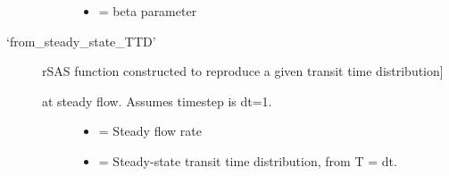 \documentclass[letterpaper,10pt,english]{sphinxmanual}
\begin{document}
\begin{fulllineitems}
\begin{description}
\begin{description}
\begin{itemize}
\item {} 
 = beta parameter

\end{itemize}

\end{description}

\item[{`from\_steady\_state\_TTD'}] \leavevmode{[}rSAS function constructed to reproduce a given transit time distribution{]}\begin{description}
\item[{at steady flow. Assumes timestep is dt=1.}] \leavevmode\begin{itemize}
\item {} 
 = Steady flow rate

\item {} 
 = Steady-state transit time distribution, from T = dt.

\end{itemize}

\end{description}

\end{description}

\end{fulllineitems}

\end{document}
